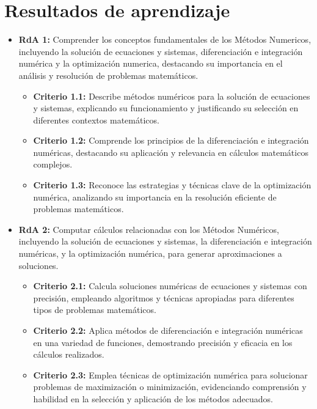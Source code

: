 \documentclass[a4,11pt]{aleph-notas}
\begin{document}
\addtolength{\headheight}{1.8\baselineskip}
\addtolength{\voffset}{-1.5\baselineskip}

\encabezado

\section{Resultados de aprendizaje} 

\begin{itemize}[leftmargin=*]
\item 
    \textbf{RdA 1:} Comprender los conceptos fundamentales de los Métodos Numericos, incluyendo la solución de ecuaciones y sistemas, diferenciación e integración numérica y la optimización numerica, destacando su importancia en el análisis y resolución de problemas matemáticos.
    \begin{itemize}[leftmargin=*]
        \item \textbf{Criterio 1.1:}  Describe métodos numéricos para la solución de ecuaciones y sistemas, explicando su funcionamiento y justificando su selección en diferentes contextos matemáticos.
        \item \textbf{Criterio 1.2:}  Comprende los principios de la diferenciación e integración numéricas, destacando su aplicación y relevancia en cálculos matemáticos complejos.
        \item \textbf{Criterio 1.3:} Reconoce las estrategias y técnicas clave de la optimización numérica, analizando su importancia en la resolución eficiente de problemas matemáticos.
    \end{itemize}
\item 
    \textbf{RdA 2:} Computar cálculos relacionadas con los Métodos Numéricos, incluyendo la solución de ecuaciones y sistemas, la diferenciación e integración numéricas, y la optimización numérica, para generar aproximaciones a soluciones.
    \begin{itemize}[leftmargin=*]
        \item \textbf{Criterio 2.1:} Calcula soluciones numéricas de ecuaciones y sistemas con precisión, empleando algoritmos y técnicas apropiadas para diferentes tipos de problemas matemáticos.
        \item \textbf{Criterio 2.2:} Aplica métodos de diferenciación e integración numéricas en una variedad de funciones, demostrando precisión y eficacia en los cálculos realizados.
        \item \textbf{Criterio 2.3:} Emplea técnicas de optimización numérica para solucionar problemas de maximización o minimización, evidenciando comprensión y habilidad en la selección y aplicación de los métodos adecuados.

\end{itemize}
\end{itemize}
\end{document}
